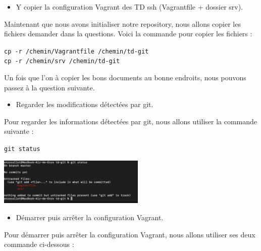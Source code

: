 \documentclass[12pt]{article}
\begin{document}
\vspace{0.3cm}

\begin{itemize}
  \item Y copier la configuration Vagrant des TD ssh (Vagrantfile + dossier srv).
\end{itemize}

Maintenant que nous avons initialiser notre repository, nous allons copier les fichiers demander dans la questions. Voici la commande pour copier les fichiers : 

\texttt{cp -r /chemin/Vagrantfile /chemin/td-git} \\
\texttt{cp -r /chemin/srv /chemin/td-git}

\vspace{0.3cm}

Un fois que l'on à copier les bons documents au bonne endroits, nous pouvons passez à la question suivante. 

\vspace{0.3cm}

\begin{itemize}
  \item Regarder les modifications détectées par git.
\end{itemize}

\vspace{0.3cm}

Pour regarder les informations détectées par git, nous allons utiliser la commande suivante : 

\texttt{git status}

\vspace{0.3cm}

\begin{center}
  \includegraphics[width=7cm]{Image-TD-Git-1/git-status.png}
\end{center}

\vspace{0.3cm}

\begin{itemize}
  \item Démarrer puis arrêter la configuration Vagrant.
\end{itemize}

Pour démarrer puis arrêter la configuration Vagrant, nous allons utiliser ses deux commande ci-dessous : \newline
\end{document}

